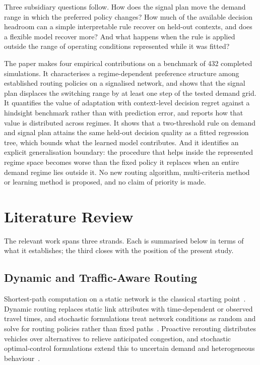 \documentclass[runningheads]{llncs}
\begin{document}
Three subsidiary questions follow. How does the signal plan move the demand range in
which the preferred policy changes? How much of the available decision headroom can a
simple interpretable rule recover on held-out contexts, and does a flexible model
recover more? And what happens when the rule is applied outside the range of operating
conditions represented while it was fitted?

The paper makes four empirical contributions on a benchmark of 432 completed
simulations. It characterises a regime-dependent preference structure among established
routing policies on a signalised network, and shows that the signal plan displaces the
switching range by at least one step of the tested demand grid. It quantifies the value
of adaptation with context-level decision regret against a hindsight benchmark rather
than with prediction error, and reports how that value is distributed across regimes. It
shows that a two-threshold rule on demand and signal plan attains the same held-out
decision quality as a fitted regression tree, which bounds what the learned model
contributes. And it identifies an explicit generalisation boundary: the procedure that
helps inside the represented regime space becomes worse than the fixed policy it
replaces when an entire demand regime lies outside it. No new routing algorithm,
multi-criteria method or learning method is proposed, and no claim of priority is
made.

\section{Literature Review}

The relevant work spans three strands. Each is summarised below in terms of what it
establishes; the third closes with the position of the present study.

\subsection{Dynamic and Traffic-Aware Routing}

Shortest-path computation on a static network is the classical starting
point~\cite{dijkstra1959note}. Dynamic routing replaces static link attributes with
time-dependent or observed travel times, and stochastic formulations treat network
conditions as random and solve for routing policies rather than fixed
paths~\cite{gao2006optimal,levering2021framework}. Proactive rerouting distributes
vehicles over alternatives to relieve anticipated congestion, and stochastic
optimal-control formulations extend this to uncertain demand and heterogeneous
behaviour~\cite{pan2013proactive,pi2017stochastic}.
\end{document}
